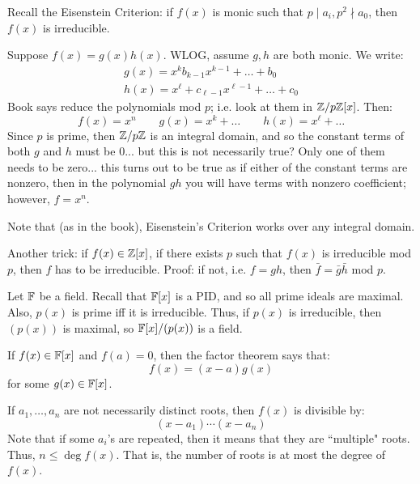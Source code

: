 Recall the Eisenstein Criterion: if $ f(x) $ is monic such that $ p \mid a_{i}, p^{2} \nmid a_{0} $,
then $ f(x) $ is irreducible.

\vspace{-0.2in}
\begin{pf}[source=Primary Source Material]
    Suppose $ f(x)=g(x)h(x) $. WLOG, assume $ g,h $ are both monic. We write:
    \begin{gather*}
        g(x)=x^{k}b_{k-1}x^{k-1}+\dots+b_{0} \\
        h(x)=x^{\ell}+c_{\ell-1}x^{\ell-1}+\dots+c_{0}
    \end{gather*}
    Book says reduce the polynomials mod $ p $; i.e. look at them in $ \mathbb{Z}/p\mathbb{Z}[x] $. Then:
    \begin{equation*}
        f(x)=x^{n} \qquad g(x) = x^{k} + \dots \qquad h(x) = x^{\ell}+\dots
    \end{equation*}
    Since $ p $ is prime, then $ \mathbb{Z}/p\mathbb{Z} $ is an integral domain, and so the constant terms
    of both $ g $ and $ h $ must be 0... but this is not necessarily true? Only one of them needs
    to be zero... \vsp
    this turns out to be true as if either of the constant terms are nonzero, then
    in the polynomial $ gh $ you will have terms with nonzero coefficient;
    however, $ f = x^{n} $.
\end{pf}
Note that (as in the book), Eisenstein's Criterion works over any integral domain.

Another trick: if $ f(x) \in \mathbb{Z}[x] $, if there exists $ p $ such that $ f(x) $ is irreducible
mod $ p $, then $ f $ has to be irreducible. Proof: if not, i.e. $ f=gh $, then $ \bar{f} =
\bar{g}\bar{h} $ mod $ p $.


Let $ \mathbb{F} $ be a field. Recall that $ \mathbb{F}[x] $ is a PID, and so all prime ideals are maximal.
Also, $ p(x) $ is prime iff it is irreducible.
Thus, if $ p(x) $ is irreducible, then $ (p(x)) $ is maximal, so $ \mathbb{F}[x]/(p(x)) $ is a field.

If $ f(x) \in \mathbb{F}[x] $ and $ f(a) = 0 $, then the factor theorem says that:
\begin{equation*}
    f(x) = (x-a)g(x)
\end{equation*}
for some $ g(x) \in \mathbb{F}[x] $.

If $ a_{1}, \dots, a_{n} $ are not necessarily distinct roots, then $ f(x) $ is divisible by:
\begin{equation*}
    (x-a_{1})\cdots(x-a_{n})
\end{equation*}
Note that if some $ a_{i} $'s are repeated, then it means that they are ``multiple" roots.
Thus, $ n \leq \deg f(x) $. That is, the number of roots is at most the degree of $ f(x) $.


